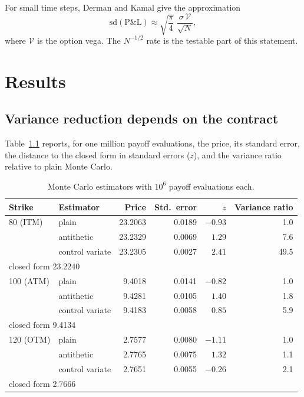 \documentclass[11pt,a4paper,oneside]{report}
\begin{document}
For small time steps, Derman and Kamal give the approximation
\begin{equation}\label{eq:dk}
\mathrm{sd}(\text{P\&L}) \approx \sqrt{\frac{\pi}{4}}\;\frac{\sigma\,\mathcal V}{\sqrt N},
\end{equation}
where $\mathcal V$ is the option vega. The $N^{-1/2}$ rate is the testable part of this statement.

\chapter{Results}

\section{Variance reduction depends on the contract}
Table~\ref{tab:vr} reports, for one million payoff evaluations, the price, its standard error, the distance to the closed form in standard errors ($z$), and the variance ratio relative to plain Monte Carlo.

\begin{table}[H]\centering\small
\begin{tabular}{llrrrr}
\toprule
Strike & Estimator & Price & Std.\ error & $z$ & Variance ratio\\
\midrule
80 (ITM) & plain & 23.2063 & 0.0189 & $-0.93$ & 1.0\\
 & antithetic & 23.2329 & 0.0069 & $1.29$ & 7.6\\
 & control variate & 23.2305 & 0.0027 & $2.41$ & 49.5\\
\multicolumn{2}{l}{\quad closed form 23.2240} &&&&\\
100 (ATM) & plain & 9.4018 & 0.0141 & $-0.82$ & 1.0\\
 & antithetic & 9.4281 & 0.0105 & $1.40$ & 1.8\\
 & control variate & 9.4183 & 0.0058 & $0.85$ & 5.9\\
\multicolumn{2}{l}{\quad closed form 9.4134} &&&&\\
120 (OTM) & plain & 2.7577 & 0.0080 & $-1.11$ & 1.0\\
 & antithetic & 2.7765 & 0.0075 & $1.32$ & 1.1\\
 & control variate & 2.7651 & 0.0055 & $-0.26$ & 2.1\\
\multicolumn{2}{l}{\quad closed form 2.7666} &&&&\\
\bottomrule
\end{tabular}
\caption{Monte Carlo estimators with $10^6$ payoff evaluations each.}\label{tab:vr}
\end{table}
\end{document}
